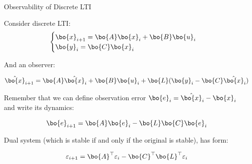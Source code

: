 \documentclass{beamer}
\begin{document}
\begin{frame}{Observability of Discrete LTI}
\begin{flushleft}

Consider discrete LTI:
\begin{equation}
\begin{cases}
\bo{x}_{i+1} = \bo{A}  \bo{x}_i + \bo{B} \bo{u}_i \\
\bo{y}_i     = \bo{C}  \bo{x}_i
\end{cases}
\end{equation}

And an observer:

\begin{equation}
\hat{\bo{x}}_{i+1} = \bo{A}  \hat{\bo{x}}_i + \bo{B} \bo{u}_i + 
\bo{L} (\bo{y}_i - \bo{C} \hat{\bo{x}}_i)
\end{equation}

Remember that we can define observation error $\bo{e}_i = \hat{\bo{x}}_i - \bo{x}_i$ and write its dynamics:

\begin{equation}
\bo{e}_{i+1} = \bo{A} \bo{e}_i - 
\bo{L} \bo{C} \bo{e}_i
\end{equation}

Dual system (which is stable if and only if the original is stable), has form:

\begin{equation}
\varepsilon_{i+1} = \bo{A}^\top \varepsilon_i - 
\bo{C}^\top \bo{L}^\top \varepsilon_i
\end{equation}


\end{flushleft}
\end{frame}
\end{document}
